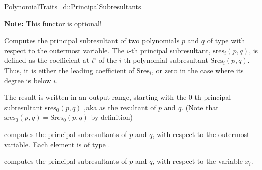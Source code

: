 \begin{ccRefConcept}{PolynomialTraits_d::PrincipalSubresultants}

\textbf{Note:} This functor is optional!

\ccDefinition

Computes the principal subresultant of two polynomials $p$ and $q$ of 
type  
with respect to the outermost variable.
The $i$-th principal subresultant, $\mathrm{sres}_i(p,q)$,
is defined as the coefficient at $t^i$ of the $i$-th polynomial
subresultant $\mathrm{Sres}_i(p,q)$. Thus, it is either the leading
coefficient of $\mathrm{Sres}_i$, or zero in the case where its degree is 
below $i$.

The result is written in an output range, starting with the $0$-th 
principal subresultant $\mathrm{sres}_0(p,q)$
,aka as the resultant of $p$ and $q$.
(Note that $\mathrm{sres}_0(p,q)=\mathrm{Sres}_0(p,q)$ by definition)


\ccOperations
{}
         { computes the principal subresultants of $p$ and $q$, 
           with respect to the outermost variable. Each element is of type
           .}

         { computes the principal subresultants of $p$ and $q$, 
           with respect to the variable $x_i$.}


\ccSeeAlso

\\
\\

\end{ccRefConcept}
